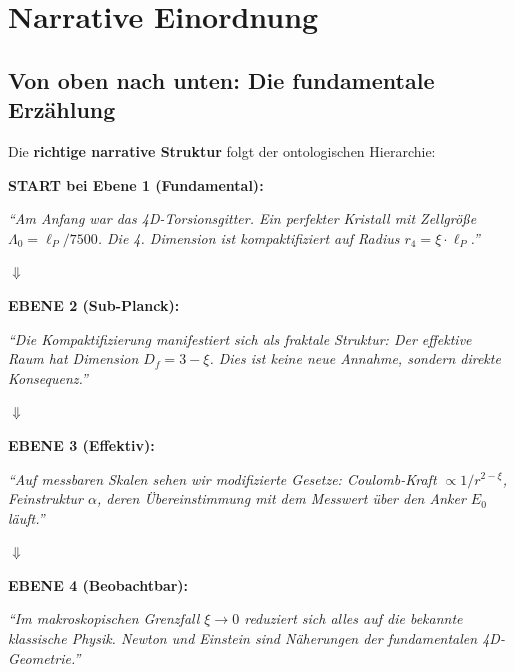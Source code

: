 	\section{Narrative Einordnung}
	
	\subsection{Von oben nach unten: Die fundamentale Erzählung}
	
	Die \textbf{richtige narrative Struktur} folgt der ontologischen Hierarchie:
	
	\begin{revolutionary}
		\textbf{START bei Ebene 1 (Fundamental):}
		
		\vspace{0.3cm}
		
		\textit{\enquote{Am Anfang war das 4D-Torsionsgitter. Ein perfekter Kristall mit Zellgröße $\Lambda_0 = \ell_P/7500$. Die 4. Dimension ist kompaktifiziert auf Radius $r_4 = \xi \cdot \ell_P$.}}
		
		\vspace{0.3cm}
		
		$\Downarrow$
		
		\vspace{0.3cm}
		
		\textbf{EBENE 2 (Sub-Planck):}
		
		\textit{\enquote{Die Kompaktifizierung manifestiert sich als fraktale Struktur: Der effektive Raum hat Dimension $D_f = 3-\xi$. Dies ist keine neue Annahme, sondern direkte Konsequenz.}}
		
		\vspace{0.3cm}
		
		$\Downarrow$
		
		\vspace{0.3cm}
		
		\textbf{EBENE 3 (Effektiv):}
		
		\textit{\enquote{Auf messbaren Skalen sehen wir modifizierte Gesetze: Coulomb-Kraft $\propto 1/r^{2-\xi}$, Feinstruktur $\alpha$, deren Übereinstimmung mit dem Messwert über den Anker $E_0$ läuft.}}
		
		\vspace{0.3cm}
		
		$\Downarrow$
		
		\vspace{0.3cm}
		
		\textbf{EBENE 4 (Beobachtbar):}
		
		\textit{\enquote{Im makroskopischen Grenzfall $\xi \to 0$ reduziert sich alles auf die bekannte klassische Physik. Newton und Einstein sind Näherungen der fundamentalen 4D-Geometrie.}}
	\end{revolutionary}
	
